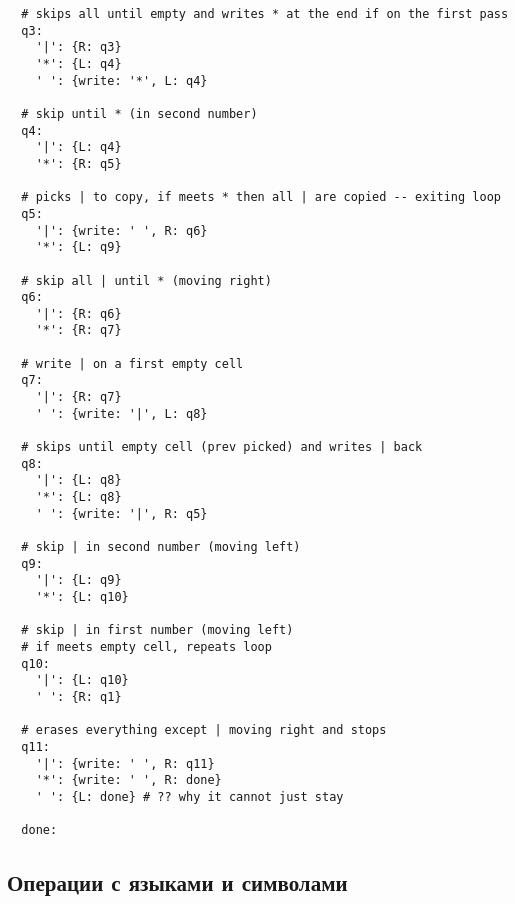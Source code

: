 \documentclass[a4paper]{article}
\begin{document}
\begin{enumerate}
\begin{verbatim}
  # skips all until empty and writes * at the end if on the first pass
  q3:
    '|': {R: q3}
    '*': {L: q4}
    ' ': {write: '*', L: q4}
    
  # skip until * (in second number)
  q4:
    '|': {L: q4}
    '*': {R: q5}
  
  # picks | to copy, if meets * then all | are copied -- exiting loop
  q5:
    '|': {write: ' ', R: q6}
    '*': {L: q9}
  
  # skip all | until * (moving right)  
  q6:
    '|': {R: q6}
    '*': {R: q7}
    
  # write | on a first empty cell
  q7:
    '|': {R: q7}
    ' ': {write: '|', L: q8}
  
  # skips until empty cell (prev picked) and writes | back
  q8:
    '|': {L: q8}
    '*': {L: q8}
    ' ': {write: '|', R: q5}
  
  # skip | in second number (moving left)
  q9:
    '|': {L: q9}
    '*': {L: q10}
  
  # skip | in first number (moving left)
  # if meets empty cell, repeats loop
  q10:
    '|': {L: q10}
    ' ': {R: q1}
  
  # erases everything except | moving right and stops
  q11:
    '|': {write: ' ', R: q11}
    '*': {write: ' ', R: done}
    ' ': {L: done} # ?? why it cannot just stay
  
  done:
        \end{verbatim}
\end{enumerate}


\subsection{Операции с языками и символами}
\end{document}
